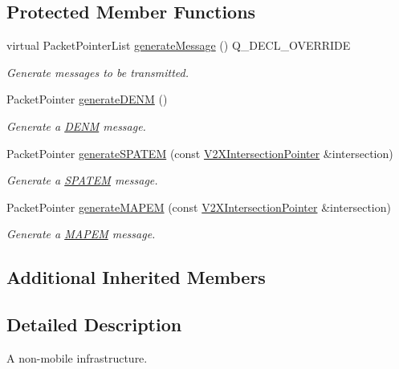 \subsection*{Protected Member Functions}
\begin{DoxyCompactItemize}
\item 
virtual Packet\+Pointer\+List \hyperlink{classFlourishAP_a63b7d385704b4ff897120751223e27f0}{generate\+Message} () Q\+\_\+\+D\+E\+C\+L\+\_\+\+O\+V\+E\+R\+R\+I\+DE
\begin{DoxyCompactList}\small\item\em Generate messages to be transmitted. \end{DoxyCompactList}\item 
Packet\+Pointer \hyperlink{classFlourishAP_ae05777f70d3ba4b90a2bdc7342bafe10}{generate\+D\+E\+NM} ()
\begin{DoxyCompactList}\small\item\em Generate a \hyperlink{structDENM}{D\+E\+NM} message. \end{DoxyCompactList}\item 
Packet\+Pointer \hyperlink{classFlourishAP_afe2550ca74f6d6375f290b97271996a2}{generate\+S\+P\+A\+T\+EM} (const \hyperlink{group__V2XFramework_ga56fae412bb1a3173fc5009ac4ade2352}{V2\+X\+Intersection\+Pointer} \&intersection)
\begin{DoxyCompactList}\small\item\em Generate a \hyperlink{structSPATEM}{S\+P\+A\+T\+EM} message. \end{DoxyCompactList}\item 
Packet\+Pointer \hyperlink{classFlourishAP_a626674a5ffab067ab081603ddc930e1d}{generate\+M\+A\+P\+EM} (const \hyperlink{group__V2XFramework_ga56fae412bb1a3173fc5009ac4ade2352}{V2\+X\+Intersection\+Pointer} \&intersection)
\begin{DoxyCompactList}\small\item\em Generate a \hyperlink{structMAPEM}{M\+A\+P\+EM} message. \end{DoxyCompactList}\end{DoxyCompactItemize}
\subsection*{Additional Inherited Members}


\subsection{Detailed Description}
A non-\/mobile infrastructure. 

